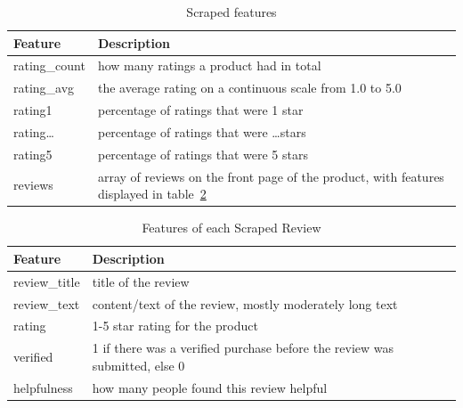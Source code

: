 \documentclass[utf8x]{ctexart}
\begin{document}
\begin{table}[ht]
  \centering
  \caption{Scraped features}
  \label{tab:feat2}
  \begin{tabular}{l p{6cm}}
    Feature       & Description                                                                                            \\
    \hline
    rating\_count & how many ratings a product had in total                                                                \\
    rating\_avg   & the average rating on a continuous scale from 1.0 to 5.0                                               \\
    rating1       & percentage of ratings that were 1 star                                                                 \\
    rating\dots   & percentage of ratings that were \dots stars                                                            \\
    rating5       & percentage of ratings that were 5 stars                                                                \\
    reviews       & array of reviews on the front page of the product, with features displayed in table~\ref{tab:feat2rev}
  \end{tabular}
\end{table}

\begin{table}[ht]
  \centering
  \caption{Features of each Scraped Review}
  \label{tab:feat2rev}
  \begin{tabular}{l p{6cm}}
    Feature       & Description                                                                \\
    \hline
    review\_title & title of the review                                                        \\
    review\_text  & content/text of the review, mostly moderately long text                    \\
    rating        & 1-5 star rating for the product                                            \\
    verified      & 1 if there was a verified purchase before the review was submitted, else 0 \\
    helpfulness   & how many people found this review helpful                                  \\
  \end{tabular}
\end{table}
\end{document}

